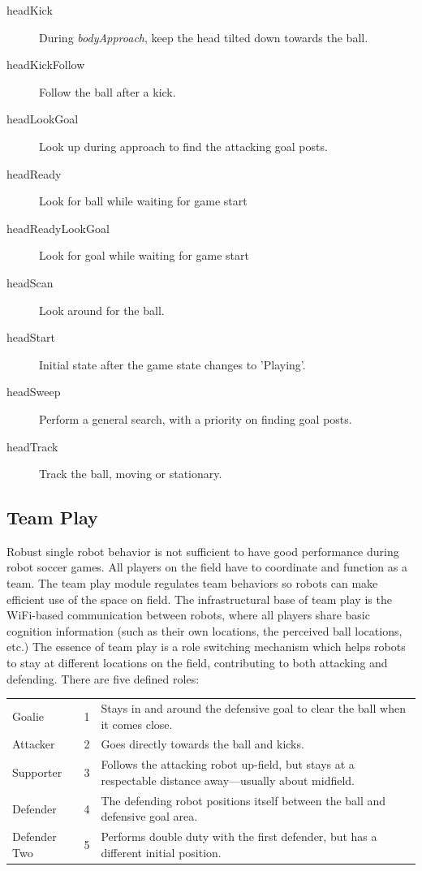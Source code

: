 \documentclass{article}
\begin{document}
	\begin{multicols}{2}
		\begin{description}
			\item[headKick] During \textit{bodyApproach}, keep the head tilted down towards the ball.
			\item[headKickFollow] Follow the ball after a kick.
			\item[headLookGoal] Look up during approach to find the attacking goal posts.
			\item[headReady] Look for ball while waiting for game start
			\item[headReadyLookGoal] Look for goal while waiting for game start
			\item[headScan] Look around for the ball.
			\item[headStart] Initial state after the game state changes to 'Playing'.
			\item[headSweep] Perform a general search, with a priority on finding goal posts.
			\item[headTrack] Track the ball, moving or stationary.
		\end{description}
	\end{multicols}

\subsection{Team Play}
	Robust single robot behavior is not sufficient to have good performance during robot soccer games. All players on the field have to coordinate and function as a team. The team play module regulates team behaviors so robots can make efficient use of the space on field. The infrastructural base of team play is the WiFi-based communication between robots, where all players share basic cognition information (such as their own locations, the perceived ball locations, etc.) The essence of team play is a role switching mechanism which helps robots to stay at different locations on the field, contributing to both attacking and defending. There are five defined roles: 

	\begin{center}
		\begin{tabular}{ l c p{7cm} } %
			Goalie & 1 & Stays in and around the defensive goal to clear the ball when it comes close. \\
			Attacker & 2 & Goes directly towards the ball and kicks. \\
			Supporter & 3 & Follows the attacking robot up-field, but stays at a respectable distance away---usually about midfield. \\
			Defender & 4 & The defending robot positions itself between the ball and defensive goal area. \\					Defender Two & 5 & Performs double duty with the first defender, but has a different initial position. \\
		\end{tabular}
	\end{center}
\end{document}
